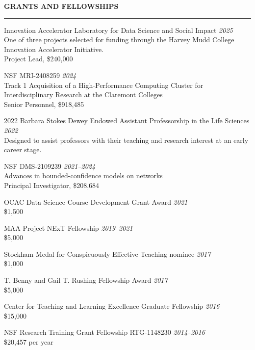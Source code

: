 \documentclass{resume} %
\renewenvironment{rSection}[1]{
\sectionskip
\textcolor{WinePurple}{\MakeUppercase{#1}}
\sectionlineskip
\hrule
\begin{list}{}{
\setlength{\leftmargin}{1.5em}
}
\item[]
}{
\end{list}
}
\begin{document}
\begin{rSection}{\bf Grants and Fellowships} \itemsep -2pt
    Innovation Accelerator Laboratory for Data Science and Social Impact \hfill {\em 2025} \\
    One of three projects selected for funding through the Harvey Mudd College Innovation Accelerator Initiative. \\
    Project Lead, \$240,000

    NSF MRI-2408259 \hfill {\em 2024} \\
    Track 1 Acquisition of a High-Performance Computing Cluster for Interdisciplinary Research at the Claremont Colleges \\
    Senior Personnel, \$918,485

    2022 Barbara Stokes Dewey Endowed Assistant Professorship in the Life Sciences \hfill {\em 2022} \\
    Designed to assist professors with their teaching and research interest at an early career stage.

    NSF DMS-2109239 \hfill {\em 2021--2024} \\
    Advances in bounded-confidence models on networks \\
    Principal Investigator, \$208,684

    OCAC Data Science Course Development Grant Award \hfill{\em 2021} \\ \$1,500

    MAA Project NExT Fellowship \hfill{\em 2019–2021} \\ \$5,000

    Stockham Medal for Conspicuously Eﬀective Teaching nominee \hfill {\em 2017} \\ \$1,000

    T. Benny and Gail T. Rushing Fellowship Award \hfill {\em 2017} \\ \$5,000

    Center for Teaching and Learning Excellence Graduate Fellowship \hfill {\em 2016} \\ \$15,000

    NSF Research Training Grant Fellowship RTG-1148230 \hfill {\em 2014--2016} \\ \$20,457 per year
\end{rSection}

\end{document}
